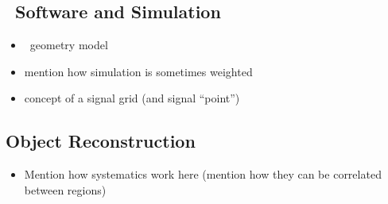 \subsection{\atlas\ Software and Simulation}
\label{sec:software}
\begin{itemize}
\item \atlas\ geometry model
\item mention how simulation is sometimes weighted
\item concept of a signal grid (and signal ``point'')
\end{itemize}

\subsection{Object Reconstruction}
\begin{itemize}
\item Mention how systematics work here (mention how they can be correlated between regions)
\end{itemize}
